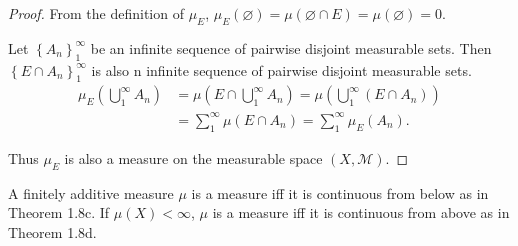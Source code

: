 \begin{proof}
    From the definition of \( \mu_{E} \), \( \mu_{E}(\varnothing) = \mu(\varnothing \cap E) = \mu(\varnothing) = 0 \).

    Let \( { \left\{ A_{n} \right\} }_{1}^{\infty} \) be an infinite sequence of pairwise disjoint measurable sets. Then \( { \left\{ E \cap A_{n} \right\} }_{1}^{\infty} \) is also n infinite sequence of pairwise disjoint measurable sets.
    \begingroup
    \allowdisplaybreaks%
    \begin{align*}
        \mu_{E}\left(\bigcup_{1}^{\infty} A_{n}\right) & = \mu\left( E \cap \bigcup_{1}^{\infty} A_{n} \right) = \mu\left(\bigcup_{1}^{\infty} (E \cap A_{n})\right) \\
                                                       & = \sum_{1}^{\infty} \mu(E \cap A_{n}) = \sum_{1}^{\infty} \mu_{E}(A_{n}).
    \end{align*}
    \endgroup

    Thus \( \mu_{E} \) is also a measure on the measurable space \( (X, \mathcal{M}) \).
\end{proof}

\newpage

\begin{exercise}
    A finitely additive measure \( \mu \) is a measure iff it is continuous from below as in Theorem 1.8c. If \( \mu(X) < \infty \), \( \mu \) is a measure iff it is continuous from above as in Theorem 1.8d.
\end{exercise}

